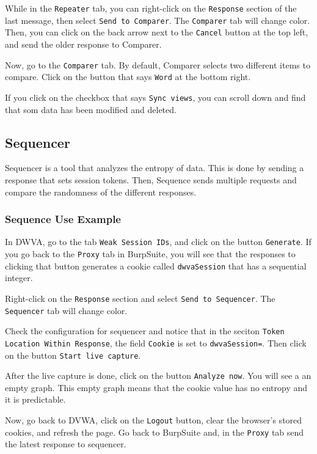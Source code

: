 \documentclass[twocolumn]{article}
\begin{document}
While in the \texttt{Repeater} tab, you can right-click on the \texttt{Response} section of the last message, then select \texttt{Send to Comparer}. The \texttt{Comparer} tab will change color. Then, you can click on the back arrow next to the \texttt{Cancel} button at the top left, and send the older response to Comparer.

Now, go to the \texttt{Comparer} tab. By default, Comparer selects two different items to compare. Click on the button that says \texttt{Word} at the bottom right.

If you click on the checkbox that says \texttt{Sync views}, you can scroll down and find that som data has been modified and deleted.

\subsection{Sequencer}

Sequencer is a tool that analyzes the entropy of data. This is done by sending a response that sets session tokens. Then, Sequence sends multiple requests and compare the randomness of the different responses.

\subsubsection{Sequence Use Example}

In DWVA, go to the tab \texttt{Weak Session IDs}, and click on the button \texttt{Generate}. If you go back to the \texttt{Proxy} tab in BurpSuite, you will see that the responses to clicking that button generates a cookie called \texttt{dwvaSession} that has a sequential integer.

Right-click on the \texttt{Response} section and select \texttt{Send to Sequencer}. The \texttt{Sequencer} tab will change color.

Check the configuration for sequencer and notice that in the seciton \texttt{Token Location Within Response}, the field \texttt{Cookie} is set to \texttt{dwvaSession=}. Then click on the button \texttt{Start live capture}.

After the live capture is done, click on the button \texttt{Analyze now}. You will see a an empty graph. This empty graph means that the cookie value has no entropy and it is predictable.

Now, go back to DVWA, click on the \texttt{Logout} button, clear the browser's stored cookies, and refresh the page. Go back to BurpSuite and, in the \texttt{Proxy} tab send the latest response to sequencer.
\end{document}
